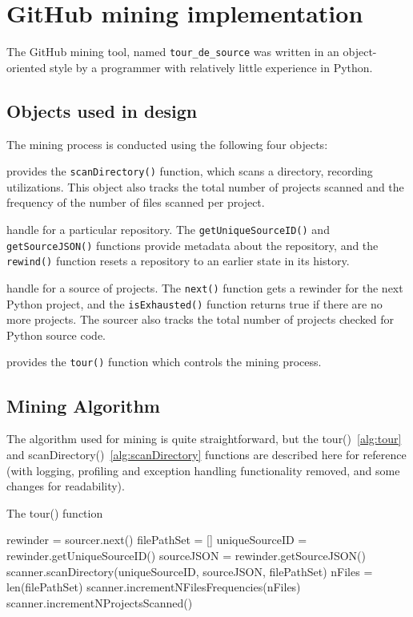 \section*{GitHub mining implementation}
\label{app:miningImplementation}

The GitHub mining tool, named {\tt tour\_de\_source} was written in an object-oriented style by a programmer with relatively little experience in Python.

\subsection*{Objects used in design}
The mining process is conducted using the following four objects:
\begin{description} \itemsep -1pt
\item[Scanner] provides the {\tt scanDirectory()} function, which scans a directory, recording utilizations.  This object also tracks the total number of projects scanned and the frequency of the number of files scanned per project.
\item[Rewinder] handle for a particular repository. The {\tt getUniqueSourceID()} and {\tt getSourceJSON()} functions provide metadata about the repository, and the {\tt rewind()} function resets a repository to an earlier state in its history.
\item[Sourcer] handle for a source of projects.  The {\tt next()} function gets a rewinder for the next Python project, and the {\tt isExhausted()} function returns true if there are no more projects.  The sourcer also tracks the total number of projects checked for Python source code.
\item[Tourist] provides the {\tt tour()} function which controls the mining process.
\end{description}

\subsection*{Mining Algorithm}
The algorithm used for mining is quite straightforward, but the tour()~\ref{alg:tour} and scanDirectory()~\ref{alg:scanDirectory} functions are described here for reference (with logging, profiling and exception handling functionality removed, and some changes for readability).

\begin{algorithm}
  \caption{The tour() function}\label{alg:tour}
  \begin{algorithmic}[1]
 \label{line:isExhausted}
    \State rewinder = sourcer.next() \label{line:next}
    \State filePathSet = []
    \State uniqueSourceID = rewinder.getUniqueSourceID()
    \State sourceJSON = rewinder.getSourceJSON()
     \label{line:rewind}
        \State scanner.scanDirectory(uniqueSourceID, sourceJSON, filePathSet)\label{line:scanDirectory}
    \EndWhile
    \State nFiles = len(filePathSet)
    \State scanner.incrementNFilesFrequencies(nFiles)\label{line:fileFrequencies}
    \State scanner.incrementNProjectsScanned()\label{line:projectScannedCount}
\EndWhile
\end{algorithmic}
\end{algorithm}

